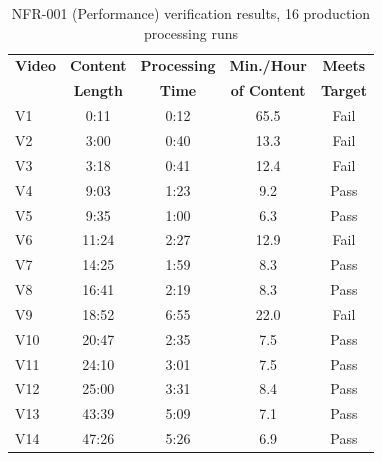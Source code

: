 \documentclass[oneside]{utmthesis}
\begin{document}
\begin{table}[H]
    \centering
    \footnotesize
    \caption{NFR-001 (Performance) verification results, 16 production processing runs}\label{tab:nfr_performance}
    \begin{tabular}{lcccc}
        \toprule
        \textbf{Video} & \textbf{Content} & \textbf{Processing} & \textbf{Min./Hour}  & \textbf{Meets}  \\
                       & \textbf{Length}  & \textbf{Time}       & \textbf{of Content} & \textbf{Target} \\
        \midrule
        V1             & 0:11             & 0:12                & 65.5                & Fail            \\
        V2             & 3:00             & 0:40                & 13.3                & Fail            \\
        V3             & 3:18             & 0:41                & 12.4                & Fail            \\
        V4             & 9:03             & 1:23                & 9.2                 & Pass            \\
        V5             & 9:35             & 1:00                & 6.3                 & Pass            \\
        V6             & 11:24            & 2:27                & 12.9                & Fail            \\
        V7             & 14:25            & 1:59                & 8.3                 & Pass            \\
        V8             & 16:41            & 2:19                & 8.3                 & Pass            \\
        V9             & 18:52            & 6:55                & 22.0                & Fail            \\
        V10            & 20:47            & 2:35                & 7.5                 & Pass            \\
        V11            & 24:10            & 3:01                & 7.5                 & Pass            \\
        V12            & 25:00            & 3:31                & 8.4                 & Pass            \\
        V13            & 43:39            & 5:09                & 7.1                 & Pass            \\
        V14            & 47:26            & 5:26                & 6.9                 & Pass            \\

\end{tabular}
\end{table}
\end{document}
